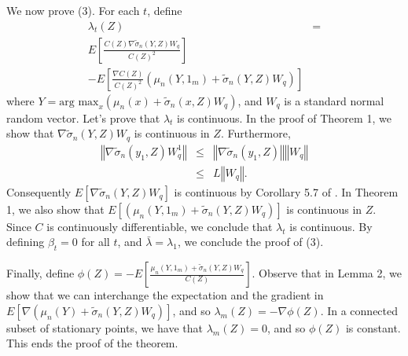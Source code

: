 \documentclass[letterpaper]{article}
\numberwithin{equation}{section}
\begin{document}
We now prove (3). For each $t$, define 
\begin{eqnarray*}
\lambda_{t}\left(Z\right) & =\\
E\left[\frac{C\left(Z\right)\nabla\tilde{\sigma}_{n}\left(Y,Z\right)W_{q}}{C\left(Z\right)^{2}}\right]\\
-E\left[\frac{\nabla C\left(Z\right)}{C\left(Z\right)^{2}}\left(\mu_{n}\left(Y,1_{m}\right)+\tilde{\sigma}_{n}\left(Y,Z\right)W_{q}\right)\right]
\end{eqnarray*}
 where $Y=\mbox{arg max}_{x}\left(\mu_{n}\left(x\right)+\tilde{\sigma}_{n}\left(x,Z\right)W_{q}\right)$,
and $W_{q}$ is a standard normal random vector. Let's prove that
$\lambda_{t}$ is continuous. In the proof of Theorem 1, we show that
$\nabla\tilde{\sigma}_{n}\left(Y,Z\right)W_{q}$ is continuous in
$Z$. Furthermore,
\begin{eqnarray*}
\left\Vert \nabla\tilde{\sigma}_{n}\left(y_{1},Z\right)W_{q}^{1}\right\Vert  & \leq & \left\Vert \nabla\tilde{\sigma}_{n}\left(y_{1},Z\right)\right\Vert \left\Vert W_{q}\right\Vert \\
 & \leq & L\left\Vert W_{q}\right\Vert .
\end{eqnarray*}
Consequently $E\left[\nabla\tilde{\sigma}_{n}\left(Y,Z\right)W_{q}\right]$
is continuous by Corollary 5.7 of \citet{bartle}. In Theorem 1, we also show
that $E\left[\left(\mu_{n}\left(Y,1_{m}\right)+\tilde{\sigma}_{n}\left(Y,Z\right)W_{q}\right)\right]$
is continuous in $Z$. Since $C$ is continuously differentiable,
we conclude that $\lambda_{t}$ is continuous. By defining $\beta_{t}=0$
for all $t$, and $\bar{\lambda}=\lambda_{1}$, we conclude the proof
of (3).

Finally, define $\phi\left(Z\right)=-E\left[\frac{\mu_{n}\left(Y,1_{m}\right)+\tilde{\sigma}_{n}\left(Y,Z\right)W_{q}}{C\left(Z\right)}\right]$.
Observe that in Lemma 2, we show that we can interchange the expectation
and the gradient in $E\left[\nabla\left(\mu_{n}\left(Y\right)+\tilde{\sigma}_{n}\left(Y,Z\right)W_{q}\right)\right]$,
and so $\lambda_{m}\left(Z\right)=-\nabla\phi\left(Z\right).$ In
a connected subset of stationary points, we have that $\lambda_{m}\left(Z\right)=0$,
and so $\phi\left(Z\right)$ is constant. This ends the proof of the
theorem.
\endproof
\end{document}
